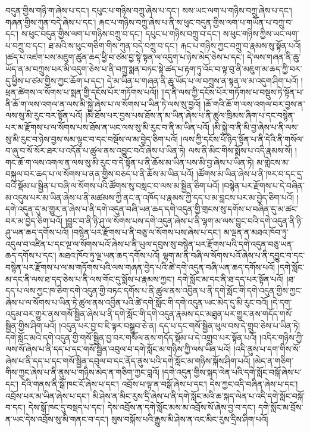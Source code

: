 བདུན་གྱིས་གཉི་ག་ཞེས་པ་དང་། དཔུང་པ་གཉིས་བཀྲུ་ཞེས་པ་དང་། སས་ཡང་ལག་པ་གཉིས་བཀྲུ་ཞེས་པ་དང་། གཞན་གྱིས་ཀུན་བདེ་ཞེས་པ་དང་། རྐང་པ་གཉིས་བཀྲུ་ཞེས་པ་ནི་ས་ཕུང་བདུན་གྱིས་ལག་པ་གཡོན་པ་བཀྲུ་བ་དང་། ས་ཕུང་བདུན་གྱིས་ལག་པ་གཉིས་བཀྲུ་བ་དང་། དཔུང་པ་གཉིས་བཀྲུ་བ་དང་། ས་ཕུང་གཉིས་ཀྱིས་ཡང་ལག་པ་བཀྲུ་བ་དང་། ཐ་མའི་ས་ཕུང་གཅིག་གིས་ཀུན་བདེ་བཀྲུ་བ་དང་། རྐང་པ་གཉིས་ཀྱང་བཀྲུ་བ་རྣམས་སུ་སྟོན་པའོ། །ཚད་པ་འཛག་པས་མཇུག་ཚུན་ཆད་ཕྱི་བ་ཙམ་བྱ་སྟེ་སྟན་ལ་འདུག་པ་ཉེས་མེད་ཅེས་པ་དང་། དེ་ལས་གཞན་ནི་ཆུ་ཡོད་ན་མ་བཀྲུས་པར་མི་འདུག་ཅེས་པ་ནི་བཀྲུ་སྨན་བཏང་སྟེ་ཚད་པ་རྟག་ཏུ་འོང་བ་ལྟ་བུ་ནི་མཇུག་མ་ཆད་ཀྱི་བར་དུ་ཕྱིས་པ་ཙམ་གྱིས་ཀྱང་ཆོག་པ་དང་། དེ་མ་ཡིན་པ་གཞན་ནི་ཆུ་ཡོད་པ་ལ་བཀྲུས་ན་སྟན་ལ་མ་འདུག་ཤིག་པའོ། །ཕྲན་ཚེགས་ལ་སོགས་པ་སྨན་གྱི་དངོས་པོར་གཏོགས་པའོ།། །།ད་ནི་ལས་ཀྱི་དངོས་པོར་གཏོགས་པ་བསྡུས་ཏེ་སྟོན་པ་ནི་ཆོ་ག་ལས་འགལ་ན་ལས་མི་སྐྱེ་ཞེས་པ་ལ་སོགས་པ་ཡིན་ཏེ་ལས་སུ་བྱའོ། །ཆོ་གའི་ཆོ་ག་ལས་འགལ་བར་བྱས་ན་ལས་སུ་མི་རུང་བར་སྟོན་པའོ། །མི་ཐོས་པར་བྱས་པས་ཐོས་ན་མ་ཡིན་ཞེས་པ་ནི་ཚུལ་ཁྲིམས་ཞིག་པ་དང་བསྙེན་པར་མ་རྫོགས་པ་ལ་སོགས་པས་ཐོས་ན་ཡང་ལས་སུ་མི་རུང་བ་ནི་མ་ཡིན་པའོ། །མི་སྐྱེ་བ་ནི་མི་བྱ་ཞེས་པ་ནི་ལས་སུ་མི་རུང་བ་ཉེས་བྱས་སམ་ལྟུང་བ་དང་བསྡོས་ལ་མ་བྱེད་ཅིག་པའོ། །ལས་ཀྱི་དངོས་པོ་ཉིད་སྟོན་པ་ནི་དེའི་ནི་གསོལ་བ་ཞུ་བ་སོ་སོར་ཐར་པ་འདོན་པ་ཚུལ་ནས་འབྱུང་བའོ་ཞེས་པ་ཡིན་ཏེ། ལས་ནི་མིང་གིས་སྨོས་པ་འདི་རྣམས་སོ། །གང་ཆོ་ག་ལས་འགལ་ན་ལས་སུ་མི་རུང་བ་དེ་སྟོན་པ་ནི་ཆོས་མ་ཡིན་པས་མི་བྱ་ཞེས་པ་ཡིན་ཏེ། མ་གླེངས་མ་བསྐུལ་བར་ཆད་པ་ལ་སོགས་པ་ནན་གྱིས་བཅད་པ་ནི་ཆོས་མ་ཡིན་པའོ། །ཚོགས་མ་ཡིན་ཞེས་པ་ནི་ཁར་བ་དང་དྲ་བའི་སྡོམ་པ་སྦྱིན་པ་བཞི་ལ་སོགས་པའི་ཚོགས་སུ་བསླང་བ་ལས་མ་སྦྱིན་ཅིག་པའོ། །བསྙེན་པར་རྫོགས་པ་དེ་བཞིན་མ་འདུས་པར་མ་ཡིན་ཞེས་པ་ནི་མཚམས་ཀྱི་ནང་ན་འཁོད་པ་རྣམས་ཀྱི་དད་པ་མ་བླངས་པར་མ་བྱེད་ཅིག་པའོ། །དགེ་འདུན་དུ་མ་གྱུར་ན་ཞེས་པ་ནི་དགེ་འདུན་བཞི་ཡན་ཆད་དགེ་འདུན་གྱི་གྲངས་སུ་དགོས་པ་བཞིན་དུ་མ་ཚང་བར་མ་བྱེད་ཅིག་པའོ། །བྱུང་བ་ནི་ཉི་ཤུ་ལ་སོགས་པས་དགེ་འདུན་ཞེས་པ་ནི་ལྷག་མ་ལས་བྱུང་བའི་དགེ་འདུན་ནི་ཉི་ཤུ་ཡན་ཆད་དགོས་པའོ། །བསྙེན་པར་རྫོགས་པ་ནི་བཅུ་ལ་སོགས་པས་ཞེས་པ་དང་། མ་ལྡན་ན་མཐའ་ཁོབ་ཏུ་འདུལ་བ་འཛིན་པ་དང་ལྔ་ལ་སོགས་པའོ་ཞེས་པ་ནི་ཡུལ་དབུས་སུ་བསྙེན་པར་རྫོགས་པའི་དགེ་འདུན་བཅུ་ཡན་ཆད་དགོས་པ་དང་། མཐའ་ཁོབ་ཏུ་ལྔ་ཡན་ཆད་དགོས་པའོ། ལྷག་མ་ནི་བཞི་ལ་སོགས་པའོ་ཞེས་པ་ནི་དབྱུང་བ་དང་བསྙེན་པར་རྫོགས་པ་ལ་མ་གཏོགས་པའི་ལས་གཞན་བྱེད་པའི་ཚེ་དགེ་འདུན་བཞི་ཡན་ཆད་དགོས་པའོ། །དགེ་སློང་མ་དང་ནི་ལས་ཐ་དད་ཅེས་པ་ནི་ལས་གོང་དུ་སྨོས་པ་རྣམས་ཀྱང་། དགེ་སློང་མ་དང་ནི་ཐ་དད་པར་སྟོན་པའོ། །ཐ་དད་པ་ལས་ཀྱང་ཁ་ཅིག་དགེ་འདུན་གྱི་བཏང་དགོས་པ་ནི་ཚུལ་ནས་འབྱིན་པ་ནི་དགེ་སློང་གི་དགེ་འདུན་གྱིས་ཀྱང་ཞེས་པ་ལ་སོགས་པ་ཡིན་ཏེ་ཚུལ་ནས་འབྱིན་པའི་ཚེ་དགེ་སློང་གི་དགེ་འདུན་ཡང་མེད་དུ་མི་རུང་བའོ། །དེ་དག་འདུམ་བར་གྱུར་ནས་གསོ་སྦྱིན་ཞེས་པ་ནི་དགེ་སློང་གི་དགེ་འདུན་རྣམས་དང་མཐུན་པར་གྱུར་ནས་གདོད་གསོ་སྦྱིན་གྱིས་ཤིག་པའོ། །འདུན་པར་བྱ་བ་ཇི་ལྟར་བསྒྲུབ་ཅེ་ན། དད་པ་དང་གསོ་སྦྱིན་ཕུལ་བས་དེ་གྲུབ་ཅེས་པ་ཡིན་ཏེ། དགེ་སློང་མའི་དགེ་འདུན་གྱི་གསོ་སྦྱིན་བྱ་བར་གསོལ་ནས་གདོད་སྡོམ་པ་དེ་འགྲུབ་པར་སྟོན་པའོ། །འདིར་གཉིས་ཀྱི་ལས་སོ་ཞེས་པ་ནི་དད་པ་དང་གསོ་སྦྱིན་འབུལ་བ་དགེ་སློང་མ་གཉིས་ཀྱི་ལས་ཡིན་པའོ། །འདི་ནུས་པ་དག་གིས་སོ་ཞེས་པ་ནི་དད་པ་དང་གསོ་སྦྱིན་དབུལ་བ་དང་ནོད་ནུས་པའི་དགེ་སློང་མ་གཉིས་སྐོས་ཤིག་པའོ། །མེད་ན་གཅིག་གིས་ཀྱང་ཞེས་པ་ནི་ནུས་པ་གཉིས་མེད་ན་གཅིག་ཀྱང་བླའོ། །དགེ་འདུན་གྱིས་སྐད་ལེན་པའི་དགེ་སློང་བསྐོ་ཞེས་པ་དང་། དེའི་གནས་ནི་སྒོ་ཁང་ངོ་ཞེས་པ་དང་། འབྲོས་པ་ལྟ་ན་བསྒོ་ཞེས་པ་དང་། དེས་ཀྱང་འདི་བཞིན་ཞེས་པ་དང་། འབྲོས་པར་མ་ཡིན་ཞེས་པ་དང་། མི་ཤེས་ན་མིང་རུས་དྲི་ཞེས་པ་ནི་དགེ་སློང་མའི་ཆ་སྐད་ལེན་པ་འདི་དགེ་སློང་བསྐོ་བ་དང་། དེས་སྒོ་ཁང་དུ་བསྡད་པ་དང་། དེས་འབྲོས་ན་དགེ་སློང་མས་མ་འབྲོས་སོ་ཞེས་བྱ་བ་དང་། དགེ་སློང་མ་བྲོས་ན་ཡང་དེས་འབྲོས་སུ་མི་གནང་བ་དང་། སུས་བསྐོས་པའི་རྒྱུས་མི་ཤེས་ན་འང་མིང་རུས་དྲིས་ཤིག་པའོ། 